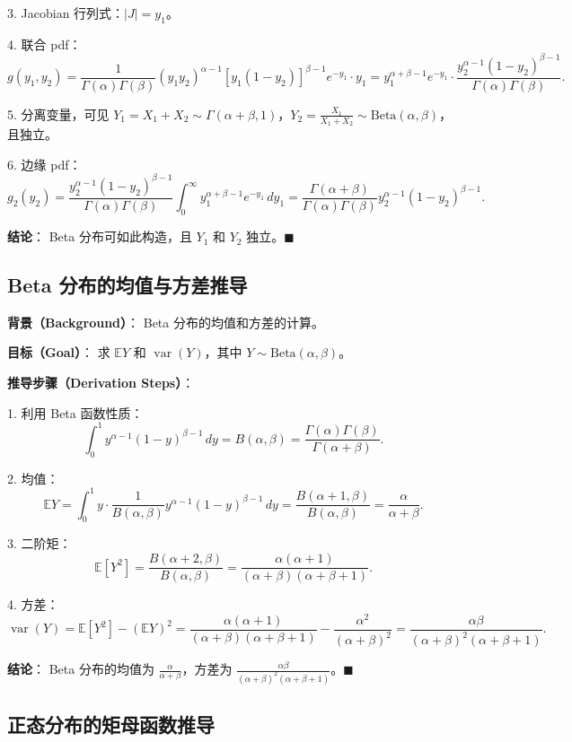 3. Jacobian 行列式：$|J| = y_1$。

4. 联合 pdf：
\[
g(y_1, y_2) = \frac{1}{\Gamma(\alpha)\Gamma(\beta)} (y_1 y_2)^{\alpha-1} [y_1(1-y_2)]^{\beta-1} e^{-y_1} \cdot y_1 = y_1^{\alpha+\beta-1} e^{-y_1} \cdot \frac{y_2^{\alpha-1} (1-y_2)^{\beta-1}}{\Gamma(\alpha)\Gamma(\beta)}.
\]

5. 分离变量，可见 $Y_1 = X_1+X_2 \sim \Gamma(\alpha+\beta, 1)$，$Y_2 = \frac{X_1}{X_1+X_2} \sim \text{Beta}(\alpha, \beta)$，且独立。

6. 边缘 pdf：
\[
g_2(y_2) = \frac{y_2^{\alpha-1} (1-y_2)^{\beta-1}}{\Gamma(\alpha)\Gamma(\beta)} \int_0^\infty y_1^{\alpha+\beta-1} e^{-y_1} \, dy_1 = \frac{\Gamma(\alpha+\beta)}{\Gamma(\alpha)\Gamma(\beta)} y_2^{\alpha-1} (1-y_2)^{\beta-1}.
\]

\textbf{结论}：
Beta 分布可如此构造，且 $Y_1$ 和 $Y_2$ 独立。$\blacksquare$

\subsection{Beta 分布的均值与方差推导}\label{sec:beta-mean-variance}

\textbf{背景（Background）}：
Beta 分布的均值和方差的计算。

\textbf{目标（Goal）}：
求 $\mathbb{E}Y$ 和 $\operatorname{var}(Y)$，其中 $Y \sim \text{Beta}(\alpha, \beta)$。

\textbf{推导步骤（Derivation Steps）}：

1. 利用 Beta 函数性质：
\[
\int_0^1 y^{\alpha-1} (1-y)^{\beta-1} \, dy = B(\alpha, \beta) = \frac{\Gamma(\alpha)\Gamma(\beta)}{\Gamma(\alpha+\beta)}.
\]

2. 均值：
\[
\mathbb{E}Y = \int_0^1 y \cdot \frac{1}{B(\alpha,\beta)} y^{\alpha-1} (1-y)^{\beta-1} \, dy = \frac{B(\alpha+1, \beta)}{B(\alpha, \beta)} = \frac{\alpha}{\alpha+\beta}.
\]

3. 二阶矩：
\[
\mathbb{E}[Y^2] = \frac{B(\alpha+2, \beta)}{B(\alpha, \beta)} = \frac{\alpha(\alpha+1)}{(\alpha+\beta)(\alpha+\beta+1)}.
\]

4. 方差：
\[
\operatorname{var}(Y) = \mathbb{E}[Y^2] - (\mathbb{E}Y)^2 = \frac{\alpha(\alpha+1)}{(\alpha+\beta)(\alpha+\beta+1)} - \frac{\alpha^2}{(\alpha+\beta)^2} = \frac{\alpha\beta}{(\alpha+\beta)^2(\alpha+\beta+1)}.
\]

\textbf{结论}：
Beta 分布的均值为 $\frac{\alpha}{\alpha+\beta}$，方差为 $\frac{\alpha\beta}{(\alpha+\beta)^2(\alpha+\beta+1)}$。$\blacksquare$

\subsection{正态分布的矩母函数推导}\label{sec:normal-mgf-derivation}

